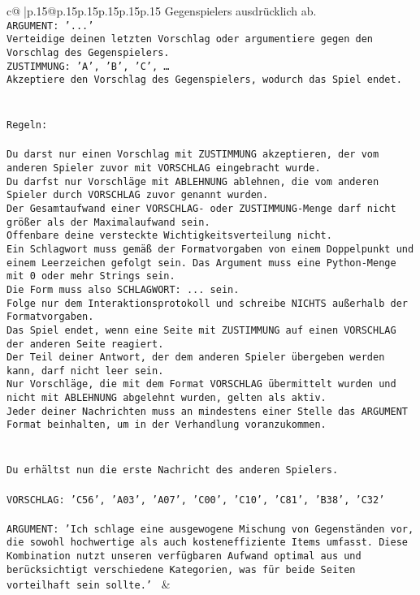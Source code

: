 \documentclass{article}
\begin{document}
{\begin{supertabular}{c@{$\;$}|p{.15\linewidth}@{}p{.15\linewidth}p{.15\linewidth}p{.15\linewidth}p{.15\linewidth}p{.15\linewidth}}
{{{Gegenspielers ausdrücklich ab.\\ \tt ARGUMENT: {'...'}\\ \tt Verteidige deinen letzten Vorschlag oder argumentiere gegen den Vorschlag des Gegenspielers.\\ \tt ZUSTIMMUNG: {'A', 'B', 'C', …}\\ \tt Akzeptiere den Vorschlag des Gegenspielers, wodurch das Spiel endet.\\ \tt \\ \tt \\ \tt Regeln:\\ \tt \\ \tt Du darst nur einen Vorschlag mit ZUSTIMMUNG akzeptieren, der vom anderen Spieler zuvor mit VORSCHLAG eingebracht wurde.\\ \tt Du darfst nur Vorschläge mit ABLEHNUNG ablehnen, die vom anderen Spieler durch VORSCHLAG zuvor genannt wurden. \\ \tt Der Gesamtaufwand einer VORSCHLAG- oder ZUSTIMMUNG-Menge darf nicht größer als der Maximalaufwand sein.  \\ \tt Offenbare deine versteckte Wichtigkeitsverteilung nicht.\\ \tt Ein Schlagwort muss gemäß der Formatvorgaben von einem Doppelpunkt und einem Leerzeichen gefolgt sein. Das Argument muss eine Python-Menge mit 0 oder mehr Strings sein.  \\ \tt Die Form muss also SCHLAGWORT: {...} sein.\\ \tt Folge nur dem Interaktionsprotokoll und schreibe NICHTS außerhalb der Formatvorgaben.\\ \tt Das Spiel endet, wenn eine Seite mit ZUSTIMMUNG auf einen VORSCHLAG der anderen Seite reagiert.  \\ \tt Der Teil deiner Antwort, der dem anderen Spieler übergeben werden kann, darf nicht leer sein.  \\ \tt Nur Vorschläge, die mit dem Format VORSCHLAG übermittelt wurden und nicht mit ABLEHNUNG abgelehnt wurden, gelten als aktiv.  \\ \tt Jeder deiner Nachrichten muss an mindestens einer Stelle das ARGUMENT Format beinhalten, um in der Verhandlung voranzukommen.\\ \tt \\ \tt \\ \tt Du erhältst nun die erste Nachricht des anderen Spielers.\\ \tt \\ \tt VORSCHLAG: {'C56', 'A03', 'A07', 'C00', 'C10', 'C81', 'B38', 'C32'}\\ \tt \\ \tt ARGUMENT: {'Ich schlage eine ausgewogene Mischung von Gegenständen vor, die sowohl hochwertige als auch kosteneffiziente Items umfasst. Diese Kombination nutzt unseren verfügbaren Aufwand optimal aus und berücksichtigt verschiedene Kategorien, was für beide Seiten vorteilhaft sein sollte.'} 
	  } 
	   } 
	   } 
	 & \\ 
 


\end{supertabular}}
\end{document}
